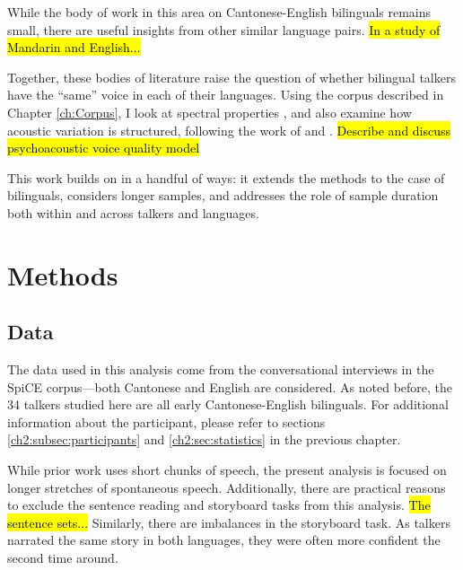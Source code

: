 While the body of work in this area on Cantonese-English bilinguals remains small, there are useful insights from other similar language pairs. \hl{In a study of Mandarin and English...}

Together, these bodies of literature raise the question of whether bilingual talkers have the ``same'' voice in each of their languages. Using the corpus described in Chapter \ref{ch:Corpus}, I look at spectral properties \citep{cheng_2020_f0,altenberg_2006_f0, ryabov_2016_self,ng_2012_ltas}, and also examine how acoustic variation is structured, following the work of \citet{kreiman_2014_theory} and \citet{lee_2019_acoustic-paper}. \hl{Describe and discuss psychoacoustic voice quality model}

This work builds on \citet{lee_2019_acoustic-paper} in a handful of ways: it extends the methods to the case of bilinguals, considers longer samples, and addresses the role of sample duration both within and across talkers and languages. 

\section{Methods}\label{ch3:sec:methods}
\subsection{Data}\label{ch3:sec:data}
The data used in this analysis come from the conversational interviews in the SpiCE corpus---both Cantonese and English are considered. As noted before, the 34 talkers studied here are all early Cantonese-English bilinguals. For additional information about the participant, please refer to sections \ref{ch2:subsec:participants} and \ref{ch2:sec:statistics} in the previous chapter. 

While prior work uses short chunks of speech, the present analysis is focused on longer stretches of spontaneous speech. Additionally, there are practical reasons to exclude the sentence reading and storyboard tasks from this analysis. \hl{The sentence sets...} Similarly, there are imbalances in the storyboard task. As talkers narrated the same story in both languages, they were often more confident the second time around. 


